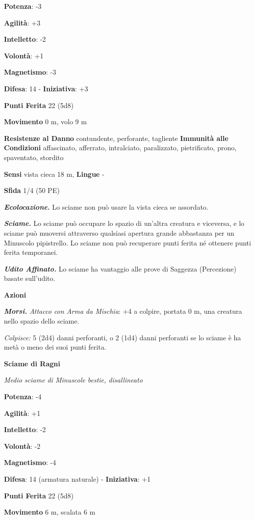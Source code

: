 \begin{multicols}{2}
\textbf{Potenza}: -3

\textbf{Agilità}: +3

\textbf{Intelletto}: -2

\textbf{Volontà}: +1

\textbf{Magnetismo}: -3

\textbf{Difesa}: 14 - \textbf{Iniziativa}: +3

\textbf{Punti Ferita} 22 (5d8)

\textbf{Movimento} 0 m, volo 9 m

\textbf{Resistenze al Danno} contundente, perforante, tagliente
\textbf{Immunità alle Condizioni} affascinato, afferrato, intralciato,
paralizzato, pietrificato, prono, spaventato, stordito

\textbf{Sensi} vista cieca 18 m,  \textbf{Lingue} -

\textbf{Sfida} 1/4 (50 PE)

\emph{\textbf{Ecolocazione.}} Lo sciame non può usare la vista cieca se
assordato.

\emph{\textbf{Sciame.}} Lo sciame può occupare lo spazio di un'altra
creatura e viceversa, e lo sciame può muoversi attraverso qualsiasi
apertura grande abbastanza per un Minuscolo pipistrello. Lo sciame non
può recuperare punti ferita né ottenere punti ferita temporanei.

\emph{\textbf{Udito Affinato.}} Lo sciame ha vantaggio alle prove di
Saggezza (Percezione) basate sull'udito.

\textbf{Azioni}

\emph{\textbf{Morsi.} Attacco con Arma da Mischia}: +4 a colpire,
portata 0 m, una creatura nello spazio dello sciame.

\emph{Colpisce:} 5 (2d4) danni perforanti, o 2 (1d4) danni perforanti se
lo sciame è ha metà o meno dei suoi punti ferita.

\textbf{Sciame di Ragni}

\emph{Medio sciame di Minuscole bestie, disallineato}

\textbf{Potenza}: -4

\textbf{Agilità}: +1

\textbf{Intelletto}: -2

\textbf{Volontà}: -2

\textbf{Magnetismo}: -4

\textbf{Difesa}: 14 (armatura naturale) - \textbf{Iniziativa}: +1

\textbf{Punti Ferita} 22 (5d8)

\textbf{Movimento} 6 m, scalata 6 m


\end{multicols}
